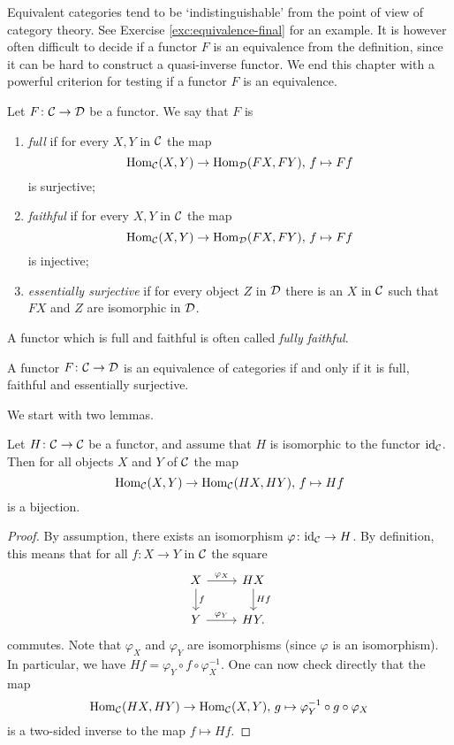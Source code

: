 Equivalent categories tend to be `indistinguishable' from the point of view of category theory. See Exercise \ref{exc:equivalence-final} for an example. It is however often difficult to decide if a functor $F$ is an equivalence from the definition, since it can be hard to construct a quasi-inverse functor. We end this chapter with a powerful criterion for testing if a functor $F$ is an equivalence.

\begin{definition}
Let $F\colon {\mathcal{C}} \to {\mathcal{D}}$ be a functor. We say that $F$ is
\begin{enumerate}
\item \emph{full} if for every $X,Y$ in ${\mathcal{C}}$ the map
\[
	\operatorname{Hom}_{\mathcal{C}}(X,Y) \to \operatorname{Hom}_{\mathcal{D}}(FX,FY),\, f \mapsto Ff
\]
 is surjective;
\item \emph{faithful} if for every $X,Y$ in ${\mathcal{C}}$ the map
\[
	\operatorname{Hom}_{\mathcal{C}}(X,Y) \to \operatorname{Hom}_{\mathcal{D}}(FX,FY),\, f \mapsto Ff
\]
is injective;
\item \emph{essentially surjective} if for every object $Z$ in ${\mathcal{D}}$ there is an $X$ in ${\mathcal{C}}$ such that $FX$ and $Z$ are isomorphic in ${\mathcal{D}}$.
\end{enumerate}
A functor which is full and faithful is often called \emph{fully faithful}.
\end{definition}



\begin{theorem}\label{thm:equivalence-of-categories}
A functor $F\colon {\mathcal{C}} \to {\mathcal{D}}$ is an equivalence of categories if and only if it is full, faithful and essentially surjective.
\end{theorem}

We start with two lemmas. 

\begin{lemma}\label{lemma:functor-iso-to-id}
Let $H\colon {\mathcal{C}} \to {\mathcal{C}}$ be a functor, and assume that $H$ is isomorphic to the functor ${\rm id}_{\mathcal{C}}$. Then for all objects $X$ and $Y$ of ${\mathcal{C}}$ the map
\[
	\operatorname{Hom}_{\mathcal{C}}(X,Y) \to \operatorname{Hom}_{\mathcal{C}}(HX, HY),\, f \mapsto Hf
\]
is a bijection.
\end{lemma}

\begin{proof}
By assumption, there exists an isomorphism $\varphi\colon {\rm id}_{\mathcal{C}} \to H$. By definition, this means that for all $f\colon X\to Y$ in ${\mathcal{C}}$ the square
\[
\begin{tikzcd}
	X \arrow{r}{\varphi_X} \arrow{d}{f} & HX \arrow{d}{Hf} \\
	Y \arrow{r}{\varphi_Y} & HY.
\end{tikzcd}
\]
commutes. Note that $\varphi_X$ and $\varphi_Y$ are isomorphisms (since $\varphi$ is an isomorphism). In particular, we have $Hf = \varphi_Y \circ f \circ \varphi_X^{-1}$. One can now check directly that the map
\[
	\operatorname{Hom}_{\mathcal{C}}(HX,HY) \to \operatorname{Hom}_{\mathcal{C}}(X,Y),\, g \mapsto \varphi_Y^{-1} \circ g \circ \varphi_X
\]
is a two-sided inverse to the map $f\mapsto Hf$.
\end{proof}

